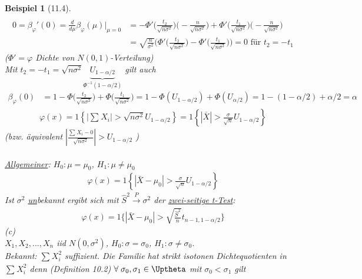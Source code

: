 \documentclass[a4paper,openany]{book}
\theoremstyle{mytheoremstyle}
\newtheorem*{bei}{Beispiel}
\theoremstyle{mytheoremstyle2}
\begin{document}
\begin{bei}[11.4]
\begin{align*}
  \end{align*}
  \begin{align*}
    0=\beta _{\varphi }'(0)=\frac{d}{d \mu }\beta  _{\varphi }(\mu )\bigg|_{\mu =0}^{}
    &=-\Phi'\bigg(\frac{t_2}{\sqrt{n \sigma ^2}}\bigg)\bigg(-\frac{n}{\sqrt{n \sigma ^2}}\bigg)+\Phi'\bigg(\frac{t_1}{\sqrt{n \sigma ^2}}\bigg)\bigg(-\frac{n}{\sqrt{n \sigma ^2}}\bigg)\\
    &=\sqrt{\frac{n}{\sigma ^2}}\bigg(\Phi'\bigg(\frac{t_2}{\sqrt{n \sigma ^2}}\bigg)-\Phi'\bigg(\frac{t_1}{\sqrt{n \sigma ^2}}\bigg)\bigg)=0 \text{ für }t_2=-t_1
  \end{align*}
  ($\Phi'=\varphi $ Dichte von $N(0,1)$-Verteilung)\\
  Mit $t_2=-t_1=\sqrt{n \sigma ^2}\underbrace{U _{1-\alpha /2}}_{\Phi ^{-1}(1-\alpha /2)}$ gilt auch
  \begin{align*}
    \beta _{\varphi }(0)
    &=1-\Phi\bigg(\frac{t_2}{\sqrt{n \sigma ^2}}\bigg)+\Phi\bigg(\frac{t_1}{\sqrt{n \sigma ^2}}\bigg)=1-\Phi(U _{1-\alpha /2})+\Phi(U _{\alpha /2})=1-(1 -\alpha /2)+\alpha /2=\alpha 
  \end{align*}
  \begin{align*}
    \varphi (x)=1\left\{\bigg|\sum_{}^{}{X_i}\bigg|>\sqrt{n \sigma ^2}U _{1-\alpha /2}\right\}=1 \left\{|\bar{X}|>\frac{\sigma }{\sqrt{n}}U _{1-\alpha /2}\right\}
  \end{align*}
  (bzw. äquivalent $\left|\frac{\sum_{}^{}{X_i}-0}{\sqrt{n \sigma ^2}}\right|>U _{1-\alpha /2}$ )\\\\
  \underline{Allgemeiner}: $H_0:\mu =\mu _0$, $H_1:\mu  \neq \mu _0$ 
  \begin{align*}
    \varphi (x)=1 \left\{|\bar{X}-\mu _0|>\frac{\sigma }{\sqrt{n}}U _{1-\alpha /2}\right\}
  \end{align*}
Ist $\sigma ^2$ \underline{un}bekannt ergibt sich mit $\hat{S}^2 \overset{P}\rightarrow \sigma ^2$ der \underline{zwei-seitige t-Test}:
\begin{align*}
  \varphi (x)=1 \bigg\{|\bar{X}-\mu _0|>\sqrt{\frac{\hat{S}^2}{n}}{t _{n-1,1-\alpha /2}}\bigg\}
\end{align*}
(c) \\
$X_1,X_2,...,X_n $ iid $N(0,\sigma ^2)$, $H_0:\sigma =\sigma _0$, $H_1:\sigma \neq \sigma _0$. \\
Bekannt: $\sum_{}^{}{X_i^2}$ suffizient. Die Familie hat strikt isotonen Dichtequotienten in $\sum_{}^{}{X_i^2}$ denn (Definition 10.2) $\forall\;\sigma _0,\sigma _1 \in \Uptheta$ mit $\sigma _0<\sigma _1$ gilt 

\end{bei}
\end{document}
